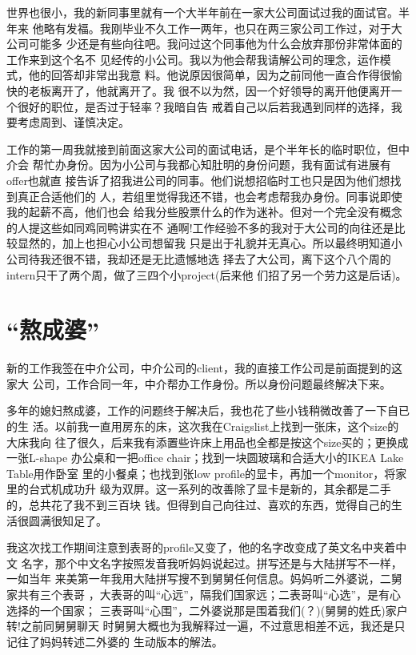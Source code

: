 \documentclass[12pt]{book}
\begin{document}
世界也很小，我的新同事里就有一个大半年前在一家大公司面试过我的面试官。半年来
他略有发福。我刚毕业不久工作一两年，也只在两三家公司工作过，对于大公司可能多
少还是有些向往吧。我问过这个同事他为什么会放弃那份非常体面的工作来到这个名不
见经传的小公司。我以为他会帮我请解公司的理念，运作模式，他的回答却非常出我意
料。他说原因很简单，因为之前同他一直合作得很愉快的老板离开了，他就离开了。我
很不以为然，因一个好领导的离开他便离开一个很好的职位，是否过于轻率？我暗自告
戒着自己以后若我遇到同样的选择，我要考虑周到、谨慎决定。

工作的第一周我就接到前面这家大公司的面试电话，是个半年长的临时职位，但中介会
帮忙办身份。因为小公司与我都心知肚明的身份问题，我有面试有进展有offer也就直
接告诉了招我进公司的同事。他们说想招临时工也只是因为他们想找到真正合适他们的
人，若组里觉得我还不错，也会考虑帮我办身份。同事说即使我的起薪不高，他们也会
给我分些股票什么的作为迷补。但对一个完全没有概念的人提这些如同鸡同鸭讲实在不
通啊!工作经验不多的我对于大公司的向往还是比较显然的，加上也担心小公司想留我
只是出于礼貌并无真心。所以最终明知道小公司待我还很不错，我却还是无比遗憾地选
择去了大公司，离下这个八个周的intern只干了两个周，做了三四个小project(后来他
们招了另一个劳力这是后话)。
\section{“熬成婆”}
\label{sec-9-46}

新的工作我签在中介公司，中介公司的client，我的直接工作公司是前面提到的这家大
公司，工作合同一年，中介帮办工作身份。所以身份问题最终解决下来。

多年的媳妇熬成婆，工作的问题终于解决后，我也花了些小钱稍微改善了一下自已的生
活。以前我一直用房东的床，这次我在Craigslist上找到一张床，这个size的大床我向
往了很久，后来我有添置些许床上用品也全都是按这个size买的；更换成一张L-shape
办公桌和一把office chair；找到一块圆玻璃和合适大小的IKEA Lake Table用作卧室
里的小餐桌；也找到张low profile的显卡，再加一个monitor，将家里的台式机成功升
级为双屏。这一系列的改善除了显卡是新的，其余都是二手的，总共花了我不到三百块
钱。但得到自己向往过、喜欢的东西，觉得自己的生活很圆满很知足了。

我这次找工作期间注意到表哥的profile又变了，他的名字改变成了英文名中夹着中文
名字，那个中文名字按照发音我听妈妈说起过。拼写还是与大陆拼写不一样，一如当年
来美第一年我用大陆拼写搜不到舅舅任何信息。妈妈听二外婆说，二舅家共有三个表哥
，大表哥的叫“心远”，隔我们国家远；二表哥叫“心选”，是有心选择的一个国家；
三表哥叫“心围”，二外婆说那是围着我们(？)(舅舅的姓氏)家户转!之前同舅舅聊天
时舅舅大概也为我解释过一遍，不过意思相差不远，我还是只记往了妈妈转述二外婆的
生动版本的解法。
\end{document}
